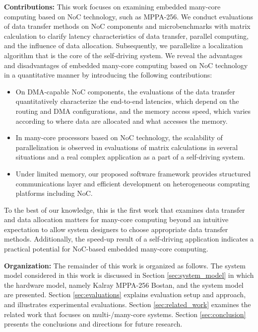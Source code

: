 \textbf{Contributions:}
This work focuses on examining embedded many-core computing based on NoC technology, such as MPPA-256.
We conduct evaluations of data transfer methods on NoC components and microbenchmarks with matrix calculation to clarify latency characteristics of data transfer, parallel computing, and the influence of data allocation.
Subsequently, we parallelize a localization algorithm that is the core of the self-driving system.
We reveal the advantages and disadvantages of embedded many-core computing based on NoC technology in a quantitative manner by introducing the following contributions:

\begin{itemize}
  \setlength{\leftskip}{-5mm}
  \item On DMA-capable NoC components, the evaluations of the data transfer quantitatively characterize the end-to-end latencies, which depend on the routing and DMA configurations, and the memory access speed, which varies according to where data are allocated and what accesses the memory.
  \item In many-core processors based on NoC technology, the scalability of parallelization is observed in evaluations of matrix calculations in several situations and a real complex application as a part of a self-driving system.
  \item Under limited memory, our proposed software framework provides structured communications layer and efficient development on heterogeneous computing platforms including NoC.
\end{itemize}

To the best of our knowledge, this is the first work that examines data transfer and data allocation matters for many-core computing beyond an intuitive expectation to allow system designers to choose appropriate data transfer methods.
Additionally, the speed-up result of a self-driving application indicates a practical potential for NoC-based embedded many-core computing.

\textbf{Organization:}
The remainder of this work is organized as follows.
The system model considered in this work is discussed in Section \ref{sec:system_model} in which the hardware model, namely Kalray MPPA-256 Bostan, and the system model are presented.
Section \ref{sec:evaluations} explains evaluation setup and approach, and illustrates experimental evaluations.
Section \ref{sec:related_work} examines the related work that focuses on multi-/many-core systems.
Section \ref{sec:conclusion} presents the conclusions and directions for future research.


